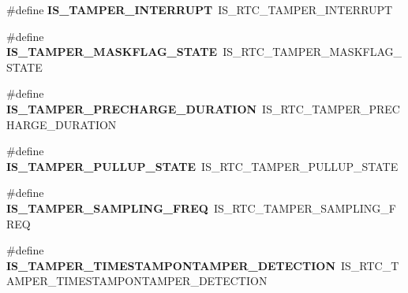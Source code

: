 \begin{DoxyCompactItemize}
\item 
\#define {\bfseries I\+S\+\_\+\+T\+A\+M\+P\+E\+R\+\_\+\+I\+N\+T\+E\+R\+R\+U\+PT}~I\+S\+\_\+\+R\+T\+C\+\_\+\+T\+A\+M\+P\+E\+R\+\_\+\+I\+N\+T\+E\+R\+R\+U\+PT\hypertarget{group___h_a_l___r_t_c___aliased___macros_gaa441c6cceeee673784fd5f9dcd1a0334}{}\label{group___h_a_l___r_t_c___aliased___macros_gaa441c6cceeee673784fd5f9dcd1a0334}

\item 
\#define {\bfseries I\+S\+\_\+\+T\+A\+M\+P\+E\+R\+\_\+\+M\+A\+S\+K\+F\+L\+A\+G\+\_\+\+S\+T\+A\+TE}~I\+S\+\_\+\+R\+T\+C\+\_\+\+T\+A\+M\+P\+E\+R\+\_\+\+M\+A\+S\+K\+F\+L\+A\+G\+\_\+\+S\+T\+A\+TE\hypertarget{group___h_a_l___r_t_c___aliased___macros_ga936b760d07038d51cd9a72f1f0456711}{}\label{group___h_a_l___r_t_c___aliased___macros_ga936b760d07038d51cd9a72f1f0456711}

\item 
\#define {\bfseries I\+S\+\_\+\+T\+A\+M\+P\+E\+R\+\_\+\+P\+R\+E\+C\+H\+A\+R\+G\+E\+\_\+\+D\+U\+R\+A\+T\+I\+ON}~I\+S\+\_\+\+R\+T\+C\+\_\+\+T\+A\+M\+P\+E\+R\+\_\+\+P\+R\+E\+C\+H\+A\+R\+G\+E\+\_\+\+D\+U\+R\+A\+T\+I\+ON\hypertarget{group___h_a_l___r_t_c___aliased___macros_gacaaf7b6159a85289691dea9b0d3a6195}{}\label{group___h_a_l___r_t_c___aliased___macros_gacaaf7b6159a85289691dea9b0d3a6195}

\item 
\#define {\bfseries I\+S\+\_\+\+T\+A\+M\+P\+E\+R\+\_\+\+P\+U\+L\+L\+U\+P\+\_\+\+S\+T\+A\+TE}~I\+S\+\_\+\+R\+T\+C\+\_\+\+T\+A\+M\+P\+E\+R\+\_\+\+P\+U\+L\+L\+U\+P\+\_\+\+S\+T\+A\+TE\hypertarget{group___h_a_l___r_t_c___aliased___macros_gaf061929111a6987f8a74e09e239d686b}{}\label{group___h_a_l___r_t_c___aliased___macros_gaf061929111a6987f8a74e09e239d686b}

\item 
\#define {\bfseries I\+S\+\_\+\+T\+A\+M\+P\+E\+R\+\_\+\+S\+A\+M\+P\+L\+I\+N\+G\+\_\+\+F\+R\+EQ}~I\+S\+\_\+\+R\+T\+C\+\_\+\+T\+A\+M\+P\+E\+R\+\_\+\+S\+A\+M\+P\+L\+I\+N\+G\+\_\+\+F\+R\+EQ\hypertarget{group___h_a_l___r_t_c___aliased___macros_ga534eeb558f5ddd78594acc82dbc56b9d}{}\label{group___h_a_l___r_t_c___aliased___macros_ga534eeb558f5ddd78594acc82dbc56b9d}

\item 
\#define {\bfseries I\+S\+\_\+\+T\+A\+M\+P\+E\+R\+\_\+\+T\+I\+M\+E\+S\+T\+A\+M\+P\+O\+N\+T\+A\+M\+P\+E\+R\+\_\+\+D\+E\+T\+E\+C\+T\+I\+ON}~I\+S\+\_\+\+R\+T\+C\+\_\+\+T\+A\+M\+P\+E\+R\+\_\+\+T\+I\+M\+E\+S\+T\+A\+M\+P\+O\+N\+T\+A\+M\+P\+E\+R\+\_\+\+D\+E\+T\+E\+C\+T\+I\+ON\hypertarget{group___h_a_l___r_t_c___aliased___macros_ga7da808c5448f1ebf7f29c44dee830446}{}\label{group___h_a_l___r_t_c___aliased___macros_ga7da808c5448f1ebf7f29c44dee830446}


\end{DoxyCompactItemize}

